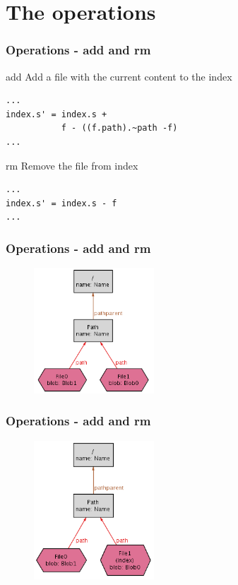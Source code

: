 \documentclass{beamer}
\begin{document}
\section{The operations}
\begin{frame}[fragile]
   \frametitle{Operations - add and rm}
   \begin{block}{add}
      Add a file with the current content to the index
   \end{block}
   \tiny
   \begin{lstlisting}
...
index.s' = index.s + 
           f - ((f.path).~path -f)
...   
   \end{lstlisting}
   \normalsize
   \begin{block}{rm}
      Remove the file from index
   \end{block}
   \tiny
   \begin{lstlisting}
...
index.s' = index.s - f
...
   \end{lstlisting}
\end{frame}

\begin{frame}[fragile]
   \frametitle{Operations - add and rm}
   \begin{figure}
      \centering
      \includegraphics[width=0.4\textwidth]{images/add1.png}
   \end{figure}
\end{frame}

\begin{frame}[fragile]
   \frametitle{Operations - add and rm}
   \begin{figure}
      \centering
      \includegraphics[width=0.4\textwidth]{images/add2.png}
   \end{figure}
\end{frame}
\end{document}
